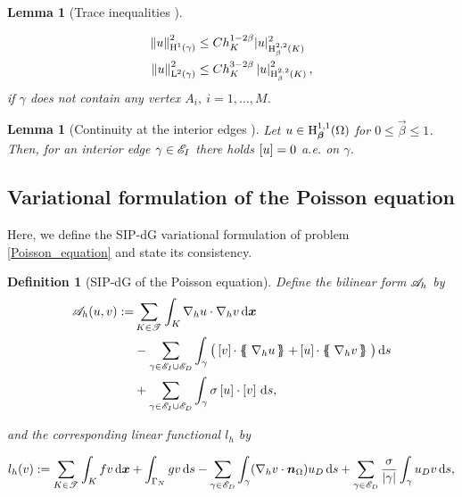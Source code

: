 \documentclass[a4paper,11pt]{article}
\newtheorem{definition}{Definition}[section]
\newtheorem{lemma}[theorem]{Lemma}
\begin{document}
{\begin{lemma}[Trace inequalities {\cite[Lemma A.2.4]{Wihler:2003}}]
\begin{enumerate}
    \begin{equation}
    \begin{split}
    \left\|u\right\|^{2}_{\operatorname H^{1}(\gamma)} &\leq Ch_{K}^{1-2\beta}|u|^{2}_{\operatorname H^{2,2}_{\beta}(K)}\\
     \left\|u\right\|^{2}_{\operatorname L^{2}(\gamma)} &\leq  C h_{K}^{3-2\beta}\left|u\right|^{2}_{\operatorname H^{2,2}_{\beta}(K)},
    \end{split}
    \end{equation}
if $\gamma$ does not contain any vertex $A_{i}, \ i = 1, \dots,M$.
\end{enumerate}

\end{lemma}

\begin{lemma}[Continuity at the interior edges {\cite[Lemma 1.3.4]{Wihler:2003}}]\label{lemma:null_jump}
Let $u \in \operatorname H^{1,1}_{\boldsymbol \beta}(\Omega)$ for $0 \leq \vec{\beta} \leq 1$. Then, for an interior edge $\gamma \in \mathscr E_{I}$ there holds $\left[ u\right] = 0$ a.e. on $\gamma$.  
\end{lemma}

\subsection{Variational formulation of the Poisson equation}

Here, we define the SIP-dG variational formulation of problem \eqref{Poisson_equation} and state its consistency.

\begin{definition}[SIP-dG of the Poisson equation] \label{def:SIPG}
Define the bilinear form $\mathscr A_{h}$ by
\begin{equation}
\begin{split}
  \cA_{h}(u,v) := &\sum_{K \in \T{}} \int_{K} \nabla_{h} u \cdot \nabla_{h} v \d \vec{x} \\
  & - \sum_{\gamma \in \cE_{I}\cup \cE_{D}}\int_{\gamma} \big( \jump{v} \cdot \avg{\nabla_{h}u} + \jump{u} \cdot \avg{\nabla_{h}v} \big) \d s  \\  
  & + \sum_{\gamma \in \cE_{I}\cup \cE_{D}} \int_{\gamma} \sigma \jump{u} \cdot \jump{v} \d s,
\end{split}
\label{bilinear_form_discrete}
\end{equation}

and the corresponding linear functional $l_{h}$ by

\begin{equation}
    l_{h}(v) := \sum_{K \in \mathscr T^{}} \int_{K} f v \,\mathrm{d} \boldsymbol x + \int_{\Gamma_{N}}gv \,\mathrm{d} s - \sum_{\gamma \in \mathscr E_{D}}\int_{\gamma} (\nabla_{h}v \cdot \boldsymbol n_{\Omega}) u_{D} \,\mathrm{d} s + \sum_{\gamma \in \mathscr E_{D}} \frac{\sigma}{|\gamma|} \int_{\gamma} u_{D} v \,\mathrm{d} s,
\end{equation}


\end{definition}}
\end{document}
